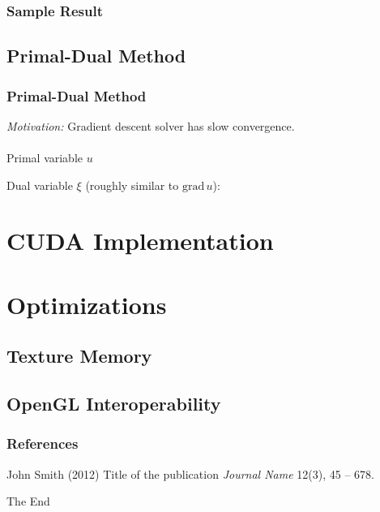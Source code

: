 \documentclass{beamer}
\begin{document}
\begin{frame}
  \frametitle{Sample Result}

\end{frame}

\subsection{Primal-Dual Method}

\begin{frame}
  \frametitle{Primal-Dual Method}
  \emph{Motivation:} Gradient descent solver has slow convergence.
  \\~\\
  Primal variable $ u $

  Dual variable $ \xi $ (roughly similar to $ \mathrm{grad} \, u $):
\end{frame}

\section{CUDA Implementation}


\section{Optimizations}


\subsection{Texture Memory}


\subsection{OpenGL Interoperability}


\begin{frame}
\frametitle{References}
\footnotesize{
\begin{thebibliography}{99} %
 John Smith (2012)
\newblock Title of the publication
\newblock \emph{Journal Name} 12(3), 45 -- 678.
\end{thebibliography}
}
\end{frame}


\begin{frame}
\Huge{\centerline{The End}}
\end{frame}

\end{document}
